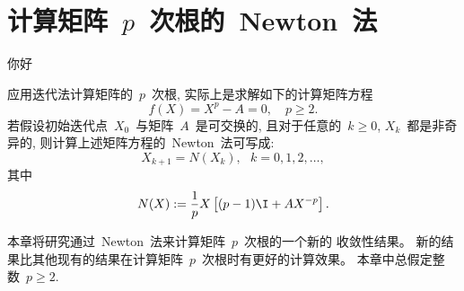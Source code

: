 

\chapter{计算矩阵~$p$~次根的~Newton~法}
\label{chapter:NM_MatrixRoot}

你好

应用迭代法计算矩阵的~$p$~次根, 实际上是求解如下的计算矩阵方程
\begin{equation}
\label{eq:f(X)=0} f(X) = X^p - A = 0, \quad p \geq 2.
\end{equation}
若假设初始迭代点~$X_0$~与矩阵~$A$~是可交换的, 且对于任意的~$k \geq
0$, $X_k$~都是非奇异的, 则计算上述矩阵方程的~Newton~法可写成:
\begin{equation}
\label{it:NM} X_{k+1}= N(X_k),\ \ \ k = 0,1,2,\ldots,
\end{equation}
其中
\begin{equation}
\label{it:NM_fun} N(X) := \frac{1}{p}X\left[(p-1)\I +
AX^{-p}\right].
\end{equation}


本章将研究通过~Newton~法来计算矩阵~$p$~次根的一个新的 收敛性结果。
新的结果比其他现有的结果在计算矩阵~$p$~次根时有更好的计算效果。
本章中总假定整数~$p \geq 2$.















